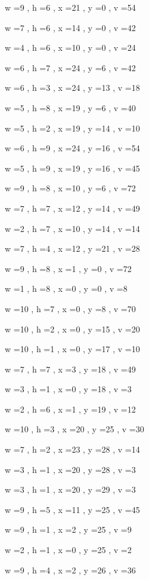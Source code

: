 \documentclass[11pt]{article}
\begin{document}
w =9 , h =6 , x =21 , y =0 , v =54
\par
w =7 , h =6 , x =14 , y =0 , v =42
\par
w =4 , h =6 , x =10 , y =0 , v =24
\par
w =6 , h =7 , x =24 , y =6 , v =42
\par
w =6 , h =3 , x =24 , y =13 , v =18
\par
w =5 , h =8 , x =19 , y =6 , v =40
\par
w =5 , h =2 , x =19 , y =14 , v =10
\par
w =6 , h =9 , x =24 , y =16 , v =54
\par
w =5 , h =9 , x =19 , y =16 , v =45
\par
w =9 , h =8 , x =10 , y =6 , v =72
\par
w =7 , h =7 , x =12 , y =14 , v =49
\par
w =2 , h =7 , x =10 , y =14 , v =14
\par
w =7 , h =4 , x =12 , y =21 , v =28
\par
w =9 , h =8 , x =1 , y =0 , v =72
\par
w =1 , h =8 , x =0 , y =0 , v =8
\par
w =10 , h =7 , x =0 , y =8 , v =70
\par
w =10 , h =2 , x =0 , y =15 , v =20
\par
w =10 , h =1 , x =0 , y =17 , v =10
\par
w =7 , h =7 , x =3 , y =18 , v =49
\par
w =3 , h =1 , x =0 , y =18 , v =3
\par
w =2 , h =6 , x =1 , y =19 , v =12
\par
w =10 , h =3 , x =20 , y =25 , v =30
\par
w =7 , h =2 , x =23 , y =28 , v =14
\par
w =3 , h =1 , x =20 , y =28 , v =3
\par
w =3 , h =1 , x =20 , y =29 , v =3
\par
w =9 , h =5 , x =11 , y =25 , v =45
\par
w =9 , h =1 , x =2 , y =25 , v =9
\par
w =2 , h =1 , x =0 , y =25 , v =2
\par
w =9 , h =4 , x =2 , y =26 , v =36
\par
\newpage
\end{document}
